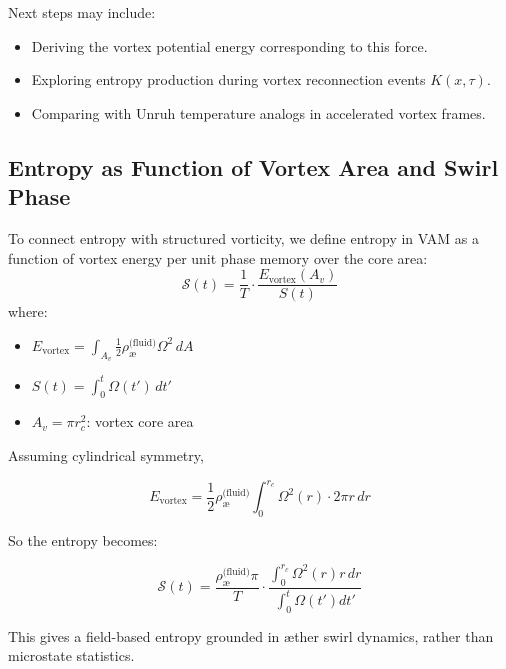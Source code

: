 \documentclass[preprint]{revtex4-2}
\begin{document}
            Next steps may include:
            \begin{itemize}
            \item Deriving the vortex potential energy corresponding to this force.
                \item Exploring entropy production during vortex reconnection events $K(x, \tau)$.
            \item Comparing with Unruh temperature analogs in accelerated vortex frames.
            \end{itemize}

            \subsection{Entropy as Function of Vortex Area and Swirl Phase}
            To connect entropy with structured vorticity, we define entropy in VAM as a function of vortex energy per unit phase memory over the core area:
            \begin{equation}
                \mathcal{S}(t) = \frac{1}{T} \cdot \frac{E_\text{vortex}(A_v)}{S(t)}
            \end{equation}
            where:
            \begin{itemize}
                \item $E_\text{vortex} = \int_{A_v} \frac{1}{2} \rho_{\text{\ae}}^{\text{(fluid)}} \Omega^2 \, dA$
                \item $S(t) = \int_0^t \Omega(t') \, dt'$
                \item $A_v = \pi r_c^2$: vortex core area
            \end{itemize}

            Assuming cylindrical symmetry,

            \begin{equation}
            E_\text{vortex} = \frac{1}{2} \rho_{\text{\ae}}^{\text{(fluid)}} \int_0^{r_c} \Omega^2(r) \cdot 2\pi r \, dr
            \end{equation}

            So the entropy becomes:

            \begin{equation}
            \boxed{
            \mathcal{S}(t) = \frac{\rho_{\text{\ae}}^{\text{(fluid)}} \pi}{T} \cdot \frac{\int_0^{r_c} \Omega^2(r) r \, dr}{\int_0^t \Omega(t') dt'}
            }
            \end{equation}

            This gives a field-based entropy grounded in æther swirl dynamics, rather than microstate statistics.
\end{document}
